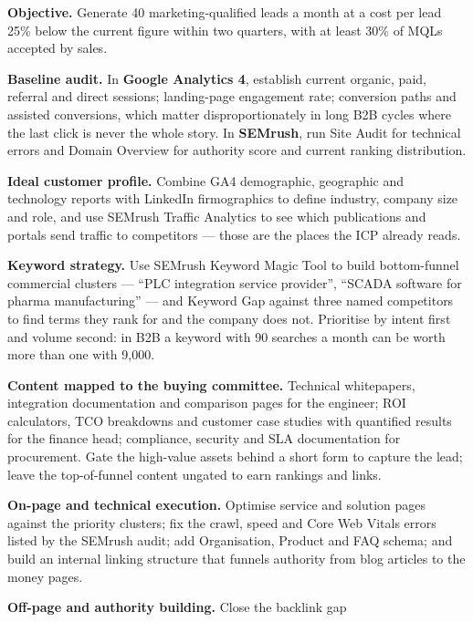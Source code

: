 \begin{qlist}
\begin{apts}
\item \textbf{Objective.} Generate 40 marketing-qualified leads a month at a
      cost per lead 25\% below the current figure within two quarters, with at
      least 30\% of MQLs accepted by sales.
\item \textbf{Baseline audit.} In \textbf{Google Analytics 4}, establish
      current organic, paid, referral and direct sessions; landing-page
      engagement rate; conversion paths and assisted conversions, which matter
      disproportionately in long B2B cycles where the last click is never the
      whole story. In \textbf{SEMrush}, run Site Audit for technical errors and
      Domain Overview for authority score and current ranking distribution.
\item \textbf{Ideal customer profile.} Combine GA4 demographic, geographic and
      technology reports with LinkedIn firmographics to define industry,
      company size and role, and use SEMrush Traffic Analytics to see which
      publications and portals send traffic to competitors --- those are the
      places the ICP already reads.
\item \textbf{Keyword strategy.} Use SEMrush Keyword Magic Tool to build
      bottom-funnel commercial clusters --- ``PLC integration service
      provider'', ``SCADA software for pharma manufacturing'' --- and Keyword
      Gap against three named competitors to find terms they rank for and the
      company does not. Prioritise by intent first and volume second: in B2B a
      keyword with 90 searches a month can be worth more than one with 9{,}000.
\item \textbf{Content mapped to the buying committee.} Technical whitepapers,
      integration documentation and comparison pages for the engineer; ROI
      calculators, TCO breakdowns and customer case studies with quantified
      results for the finance head; compliance, security and SLA documentation
      for procurement. Gate the high-value assets behind a short form to
      capture the lead; leave the top-of-funnel content ungated to earn
      rankings and links.
\item \textbf{On-page and technical execution.} Optimise service and solution
      pages against the priority clusters; fix the crawl, speed and Core Web
      Vitals errors listed by the SEMrush audit; add Organisation, Product and
      FAQ schema; and build an internal linking structure that funnels
      authority from blog articles to the money pages.
\item \textbf{Off-page and authority building.} Close the backlink gap

\end{apts}
\end{qlist}
